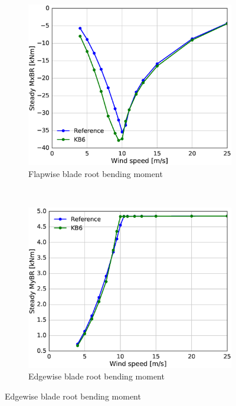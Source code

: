 \begin{figure}[tph]
\begin{subfigure}{0.50\textwidth}
\includegraphics[width=\linewidth]{figures/KB6_final/KB6_MxBR_HS2.eps}
\caption{Flapwise blade root bending moment}
\label{subfig:Mx}
\end{subfigure}
 ~
\begin{subfigure}{0.50\textwidth}
\includegraphics[width=\linewidth]{figures/KB6_final/KB6_MyBR_HS2.eps}
\caption{Edgewise blade root bending moment}
\label{subfig:My}
\end{subfigure}


\end{figure}
